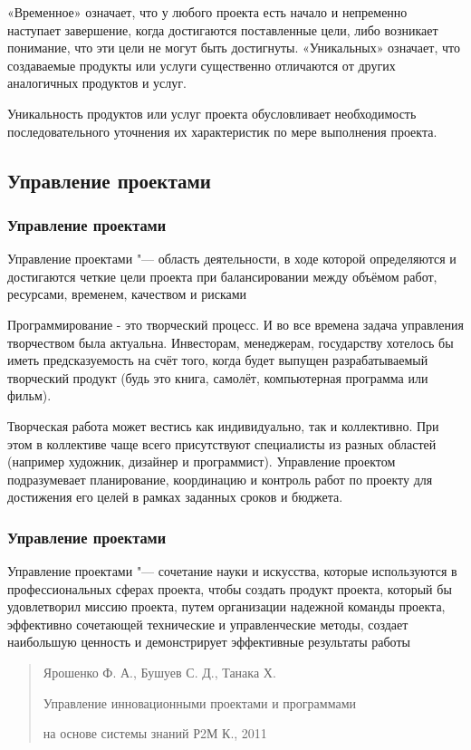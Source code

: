 \documentclass{../industrial-development}
\begin{document}
«Временное» означает, что у любого проекта есть начало и непременно наступает завершение, когда достигаются поставленные цели, либо возникает понимание, что эти цели не могут быть достигнуты. «Уникальных» означает, что создаваемые продукты или услуги существенно отличаются от других аналогичных продуктов и услуг.

Уникальность продуктов или услуг проекта обусловливает необходимость последовательного уточнения их характеристик по мере выполнения проекта.

  \subsection{Управление проектами}

    \begin{frame} \frametitle{Управление проектами}
        \begin{definition}
            Управление проектами "--- область деятельности, в ходе которой определяются и достигаются четкие цели проекта при балансировании между объёмом работ, ресурсами, временем, качеством и рисками
        \end{definition}
    \end{frame}
    \lecturenotes

Программирование - это творческий процесс. И во все времена задача управления творчеством была актуальна. Инвесторам, менеджерам, государству хотелось бы иметь предсказуемость на счёт того, когда будет выпущен разрабатываемый творческий продукт (будь это книга, самолёт, компьютерная программа или фильм).

Творческая работа может вестись как индивидуально, так и коллективно. При этом в коллективе чаще всего присутствуют специалисты из разных областей (например художник, дизайнер и программист). Управление проектом подразумевает планирование, координацию и контроль работ по проекту для достижения его целей в рамках заданных сроков и бюджета.

    \begin{frame} \frametitle{Управление проектами}
	Управление проектами "--- сочетание науки и искусства, которые используются в профессиональных сферах проекта, чтобы создать продукт проекта, который бы удовлетворил миссию проекта, путем организации надежной команды проекта, эффективно сочетающей технические и управленческие методы, создает наибольшую ценность и демонстрирует эффективные результаты работы

\begin{flushleft} \begin{quote}  \begin{scriptsize}
       Ярошенко Ф. А., Бушуев С. Д., Танака Х.

	\vspace{0.3cm}

	 Управление инновационными проектами и программами

	на основе системы знаний Р2М К., 2011
\end{scriptsize} \end{quote} \end{flushleft}
    \end{frame}
    \lecturenotes
\end{document}
